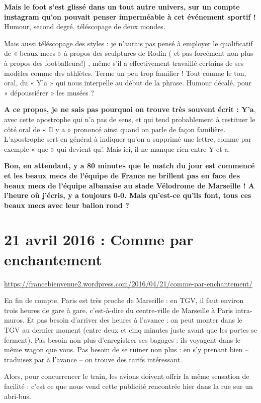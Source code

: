 \documentclass[11pt, french]{report}
\begin{document}
\textbf{Mais le foot s’est glissé dans un tout autre univers, sur un compte instagram
  qu’on pouvait penser imperméable à cet événement sportif !} Humour, second degré,
téléscopage de deux mondes.

Mais aussi téléscopage des styles : je n’aurais pas pensé à employer le
qualificatif de « beaux mecs » à propos des sculptures de Rodin ( et pas forcément
non plus à propos des footballeurs!) , même s’il a effectivement travaillé
certains de ses modèles comme des athlètes. Terme un peu trop familier ! Tout comme
le ton, oral, du « Y’a » qui nous interpelle au début de la phrase. Humour décalé,
pour « dépoussiérer » les musées ?

\textbf{A ce propos, je ne sais pas pourquoi on trouve très souvent écrit : Y’a},
avec cette apostrophe qui n’a pas de sens, et qui tend probablement à restituer le
côté oral de « Il y a » prononcé ainsi quand on parle de façon familière. L’apostrophe
sert en général à indiquer qu’on a supprimé une lettre, comme par exemple « que » qui
devient qu’. Mais ici, il ne manque rien entre Y et a.

\textbf{Bon, en attendant, y a 80 minutes que le match du jour est commencé et les
  beaux mecs de l’équipe de France ne brillent pas en face des beaux mecs de l’équipe
  albanaise au stade Vélodrome de Marseille ! A l’heure où j’écris, y a toujours 0-0.
  Mais qu’est-ce qu’ils font, tous ces beaux mecs avec leur ballon rond ?}

\vfill

\chapter{21 avril 2016 : Comme par enchantement}

\url{https://francebienvenue2.wordpress.com/2016/04/21/comme-par-enchantement/}

\vfill

En fin de compte, Paris est très proche de Marseille : en TGV, il faut environ
trois heures de gare à gare, c'est-à-dire du centre-ville de Marseille à Paris
intra-muros. Et pas besoin d'arriver des heures à l'avance : on peut monter
dans le TGV au dernier moment (entre deux et cinq minutes juste avant que les
portes se ferment).  Pas besoin non plus d'enregistrer ses bagages : ils
voyagent dans le même wagon que vous. Pas besoin de se ruiner non plus : en
s'y prenant bien -- traduisez par à l'avance -- on trouve des tarifs
intéressant.

Alors, pour concurrencer le train, les avions doivent offrir la même sensation
de facilité : c’est ce que nous vend cette publicité rencontrée hier dans la
rue sur un abri-bus.
\end{document}
